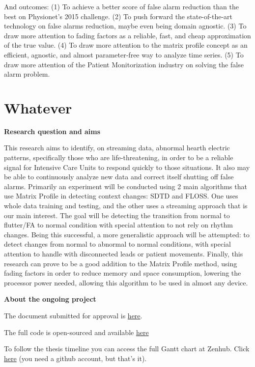 \documentclass[12pt,twoside]{reedthesis}
\begin{document}
And outcomes: (1) To achieve a better score of false alarm reduction than the best on Physionet's 2015 challenge. (2) To
push forward the state-of-the-art technology on false alarms reduction, maybe even being domain agnostic. (3) To draw
more attention to fading factors as a reliable, fast, and cheap approximation of the true value. (4) To draw more
attention to the matrix profile concept as an efficient, agnostic, and almost parameter-free way to analyze time series.
(5) To draw more attention of the Patient Monitorization industry on solving the false alarm problem.

\hypertarget{whatever}{%
\chapter{Whatever}\label{whatever}}

\textbf{Research question and aims}

This research aims to identify, on streaming data, abnormal hearth electric patterns, specifically those who are
life-threatening, in order to be a reliable signal for Intensive Care Units to respond quickly to those situations. It
also may be able to continuously analyze new data and correct itself shutting off false alarms. Primarily an experiment
will be conducted using 2 main algorithms that use Matrix Profile in detecting context changes: SDTD and FLOSS. One uses
whole data training and testing, and the other uses a streaming approach that is our main interest. The goal will be
detecting the transition from normal to flutter/FA to normal condition with special attention to not rely on rhythm
changes. Being this successful, a more generalistic approach will be attempted: to detect changes from normal to
abnormal to normal conditions, with special attention to handle with disconnected leads or patient movements. Finally,
this research can prove to be a good addition to the Matrix Profile method, using fading factors in order to reduce
memory and space consumption, lowering the processor power needed, allowing this algorithm to be used in almost any
device.

\textbf{About the ongoing project}

The document submitted for approval is
\href{https://github.com/franzbischoff/false.alarm/blob/master/protocol/Protocol.pdf}{here}.

The full code is open-sourced and available \href{https://github.com/franzbischoff/false.alarm/}{here}

To follow the thesis timeline you can access the full Gantt chart at Zenhub. Click
\href{https://app.zenhub.com/workspaces/phd-thesis-5eb2ce34f5f30b3aed0a35af/roadmap}{here} (you need a github account, but
that's it).
\end{document}
